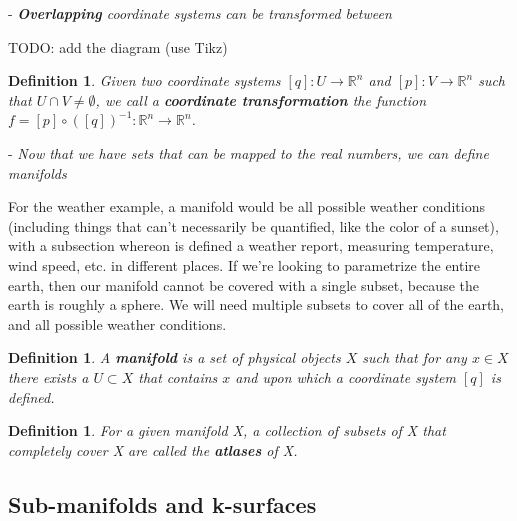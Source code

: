 \documentclass{book}
\newtheorem{defn}[equation]{Definition}
\begin{document}
- \emph{\textbf{Overlapping} coordinate systems can be transformed between}

TODO: add the diagram (use Tikz)


\begin{defn}
	Given two coordinate systems  $[q] : U \to \mathbb{R}^n$ and $[p] : V \to \mathbb{R}^n$ such that $U \cap V \neq \emptyset$, we call a \textbf{coordinate transformation} the function $f = [p] \circ ([q])^{-1} : \mathbb{R}^n \to \mathbb{R}^n$.
\end{defn}




- \emph{Now that we have sets that can be mapped to the real numbers, we can define manifolds}

For the weather example, a manifold would be all possible weather conditions (including things that can't necessarily be quantified, like the color of a sunset), with a subsection whereon is defined a weather report, measuring temperature, wind speed, etc. in different places. If we're looking to parametrize the entire earth, then our manifold cannot be covered with a single subset, because the earth is roughly a sphere. We will need multiple subsets to cover all of the earth, and all possible weather conditions. 


 
\begin{defn}
	A \textbf{manifold} is a set of physical objects $X$ such that for any $x \in X$ there exists a $U \subset X$ that contains $x$ and upon which a coordinate system $[q]$ is defined.
\end{defn}

\begin{defn}
	For a given manifold X, a collection of subsets of X that completely cover X are called the \textbf{atlases} of X. 
\end{defn}



\subsection{Sub-manifolds and k-surfaces}
\end{document}
